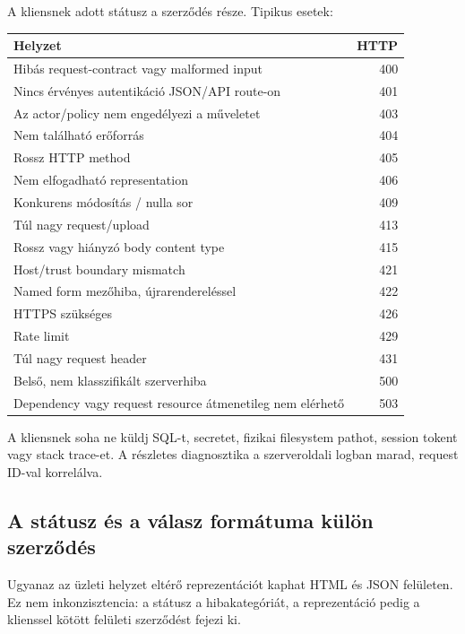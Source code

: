 A kliensnek adott státusz a szerződés része. Tipikus esetek:

\begin{longtable}{L{0.61\textwidth}r}
\toprule
Helyzet & HTTP \\
\midrule
Hibás request-contract vagy malformed input & 400 \\
Nincs érvényes autentikáció JSON/API route-on & 401 \\
Az actor/policy nem engedélyezi a műveletet & 403 \\
Nem található erőforrás & 404 \\
Rossz HTTP method & 405 \\
Nem elfogadható representation & 406 \\
Konkurens módosítás /  nulla sor & 409 \\
Túl nagy request/upload & 413 \\
Rossz vagy hiányzó body content type & 415 \\
Host/trust boundary mismatch & 421 \\
Named form mezőhiba, újrarendereléssel & 422 \\
HTTPS szükséges & 426 \\
Rate limit & 429 \\
Túl nagy request header & 431 \\
Belső, nem klasszifikált szerverhiba & 500 \\
Dependency vagy request resource átmenetileg nem elérhető & 503 \\
\bottomrule
\end{longtable}

A kliensnek soha ne küldj SQL-t, secretet, fizikai filesystem pathot, session tokent vagy stack trace-et. A részletes diagnosztika a szerveroldali logban marad, request ID-val korrelálva.

\subsection*{A státusz és a válasz formátuma külön szerződés}

Ugyanaz az üzleti helyzet eltérő reprezentációt kaphat HTML és JSON felületen. Ez nem inkonzisztencia: a státusz a hibakategóriát, a reprezentáció pedig a klienssel kötött felületi szerződést fejezi ki.

